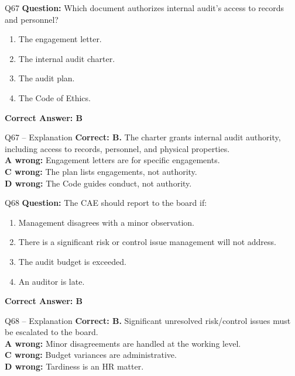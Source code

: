 \documentclass[aspectratio=169,10pt]{beamer}
\begin{document}
	\begin{frame}[t]{Q67}
		\small
		\textbf{Question:} Which document authorizes internal audit's access to records and personnel?
		\begin{enumerate}[label=\Alph*.,itemsep=1pt,topsep=2pt]
			\item The engagement letter.
			\item The internal audit charter.
			\item The audit plan.
			\item The Code of Ethics.
		\end{enumerate}
		\vspace{4pt}
		\textbf{Correct Answer: B}
	\end{frame}
	
	\begin{frame}[t]{Q67 -- Explanation}
		\small
		\textbf{Correct: B.} The charter grants internal audit authority, including access to records, personnel, and physical properties. \\[4pt]
		\textbf{A wrong:} Engagement letters are for specific engagements. \\[2pt]
		\textbf{C wrong:} The plan lists engagements, not authority. \\[2pt]
		\textbf{D wrong:} The Code guides conduct, not authority.
	\end{frame}
	
	\begin{frame}[t]{Q68}
		\small
		\textbf{Question:} The CAE should report to the board if:
		\begin{enumerate}[label=\Alph*.,itemsep=1pt,topsep=2pt]
			\item Management disagrees with a minor observation.
			\item There is a significant risk or control issue management will not address.
			\item The audit budget is exceeded.
			\item An auditor is late.
		\end{enumerate}
		\vspace{4pt}
		\textbf{Correct Answer: B}
	\end{frame}
	
	\begin{frame}[t]{Q68 -- Explanation}
		\small
		\textbf{Correct: B.} Significant unresolved risk/control issues must be escalated to the board. \\[4pt]
		\textbf{A wrong:} Minor disagreements are handled at the working level. \\[2pt]
		\textbf{C wrong:} Budget variances are administrative. \\[2pt]
		\textbf{D wrong:} Tardiness is an HR matter.
	\end{frame}
	
\end{document}
